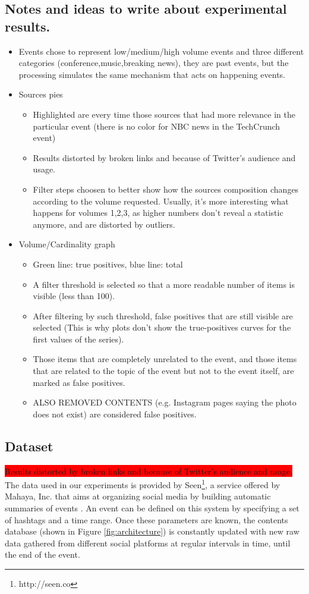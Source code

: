 \documentclass{sig-alternate}
\newcommand{\todo}[1]{\colorbox{red}{#1}}
\begin{document}
\subsection{Notes and ideas to write about experimental results.}
\begin{itemize}
\item Events chose to represent low/medium/high volume events and three different categories (conference,music,breaking news), they are past events, but the processing simulates the same mechanism that acts on happening events.
\item Sources pies
  \begin{itemize}
    \item Highlighted are every time those sources that had more relevance in the particular event (there is no color for NBC news in the TechCrunch event)
    \item Results distorted by broken links and because of Twitter's audience and usage.
    \item Filter steps choosen to better show how the sources composition changes according to the volume requested. Usually, it's more interesting what happens for volumes 1,2,3, as higher numbers don't reveal a statistic anymore, and are distorted by outliers.
  \end{itemize}
\item Volume/Cardinality graph
\begin{itemize}
    \item Green line: true positives, blue line: total
    \item A filter threshold is selected so that a more readable number of items is visible (less than 100).
    \item After filtering by such threshold, false positives that are still visible are selected (This is why plots don't show the true-positives curves for the first values of the series).
    \item Those items that are completely unrelated to the event, and those items that are related to the topic of the event but not to the event itself, are marked as false positives.
    \item ALSO REMOVED CONTENTS (e.g. Instagram pages saying the photo does not exist) are considered false positives.
\end{itemize}
\end{itemize}

\subsection{Dataset}
\label{sec:dataset}
\todo{Results distorted by broken links and because of Twitter's audience and usage.}
The data used in our experiments is provided by Seen\footnote{http://seen.co}, a service offered by Mahaya, Inc. that aims at organizing social media by building automatic summaries of events \cite{SeenWired}. An event can be defined on this system by specifying a set of hashtags and a time range. Once these parameters are known, the contents database (shown in Figure \ref{fig:architecture}) is constantly updated with new raw data gathered from different social platforms at regular intervals in time, until the end of the event.
\end{document}
